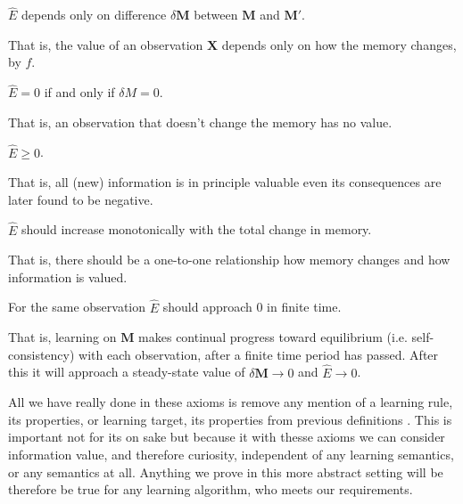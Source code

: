 \begin{axiom}
	$\hat E$ depends only on difference $\delta \mathbf{M}$ between $\mathbf{M}$ and $\mathbf{M'}$.
\end{axiom}

That is, the value of an observation $\mathbf{X}$ depends only on how
the memory changes, by $f$. 

\begin{axiom}
	$\hat E = 0$ if and only if $\delta M = 0$. 
\end{axiom}

That is, an observation that doesn’t change the memory has no value.

\begin{axiom}
	$\hat E \ge 0$.
\end{axiom}

That is, all (new) information is in principle valuable even its consequences are later found to be negative.

\begin{axiom}
	$\hat E$ should increase monotonically with the total change in memory. 
\end{axiom}

That is, there should be a one-to-one relationship how memory changes and how information is valued.

\begin{axiom}
	For the same observation $\hat E$ should approach 0 in finite time.
\end{axiom}

That is, learning on $\mathbf{M}$ makes continual progress toward equilibrium (i.e. self-consistency) with each observation, after a finite time period has passed. After this it will approach a steady-state value of $\delta \mathbf{M} \rightarrow 0$ and $\hat E \rightarrow 0$.

All we have really done in these axioms is remove any mention of a learning rule, its properties, or learning target, its properties from previous definitions \cite{Itti2009,Jaegle2019,Schmidhuber1991,Inglis2001,Reddy2016,Pirolli2007}. This is important not for its on sake but because it with thesse axioms we can consider information value, and therefore curiosity, independent of any learning semantics, or any semantics at all. Anything we prove in this more abstract setting will be therefore be true for any learning algorithm, who meets our requirements. 

